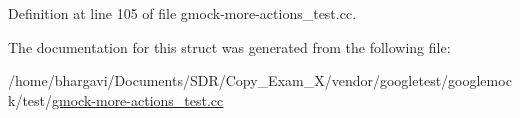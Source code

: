 Definition at line 105 of file gmock-\/more-\/actions\+\_\+test.\+cc.



The documentation for this struct was generated from the following file\+:\begin{DoxyCompactItemize}
\item 
/home/bhargavi/\+Documents/\+S\+D\+R/\+Copy\+\_\+\+Exam\+\_\+X/vendor/googletest/googlemock/test/\hyperlink{gmock-more-actions__test_8cc}{gmock-\/more-\/actions\+\_\+test.\+cc}\end{DoxyCompactItemize}
